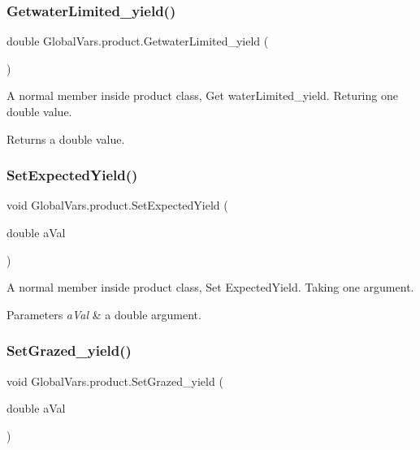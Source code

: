 \subsubsection{\texorpdfstring{GetwaterLimited\_yield()}{GetwaterLimited\_yield()}}
{\footnotesize\ttfamily double Global\+Vars.\+product.\+Getwater\+Limited\+\_\+yield (\begin{DoxyParamCaption}{ }\end{DoxyParamCaption})\hspace{0.3cm}{\ttfamily [inline]}}



A normal member inside product class, Get water\+Limited\+\_\+yield. Returing one double value. 

\begin{DoxyReturn}{Returns}
a double value. 
\end{DoxyReturn}
\mbox{\label{class_global_vars_1_1product_ac7eacd118e8a93c7423d551e7489109d}} 
\subsubsection{\texorpdfstring{SetExpectedYield()}{SetExpectedYield()}}
{\footnotesize\ttfamily void Global\+Vars.\+product.\+Set\+Expected\+Yield (\begin{DoxyParamCaption}\item[{double}]{a\+Val }\end{DoxyParamCaption})\hspace{0.3cm}{\ttfamily [inline]}}



A normal member inside product class, Set Expected\+Yield. Taking one argument. 


\begin{DoxyParams}{Parameters}
{\em a\+Val} & a double argument. \\
\hline
\end{DoxyParams}
\mbox{\label{class_global_vars_1_1product_a1abfaf513605e36d1b477e91534f7657}} 
\subsubsection{\texorpdfstring{SetGrazed\_yield()}{SetGrazed\_yield()}}
{\footnotesize\ttfamily void Global\+Vars.\+product.\+Set\+Grazed\+\_\+yield (\begin{DoxyParamCaption}\item[{double}]{a\+Val }\end{DoxyParamCaption})\hspace{0.3cm}{\ttfamily [inline]}}



